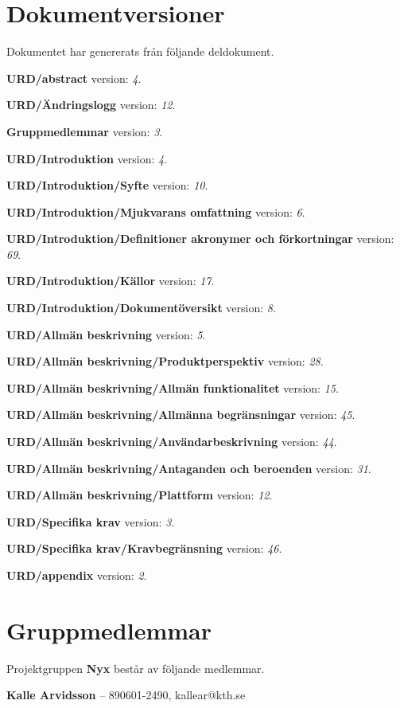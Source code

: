 \documentclass[a4paper, twoside, 11pt, titlepage]{article}
\begin{document}
\clearpage
\section*{Dokumentversioner}


Dokumentet har genererats från följande deldokument.

\textbf{URD/abstract} version: \emph{4}.

\textbf{URD/Ändringslogg} version: \emph{12}.

\textbf{Gruppmedlemmar} version: \emph{3}.

\textbf{URD/Introduktion} version: \emph{4}.

\textbf{URD/Introduktion/Syfte} version: \emph{10}.

\textbf{URD/Introduktion/Mjukvarans omfattning} version: \emph{6}.

\textbf{URD/Introduktion/Definitioner akronymer och förkortningar} version: \emph{69}.

\textbf{URD/Introduktion/Källor} version: \emph{17}.

\textbf{URD/Introduktion/Dokumentöversikt} version: \emph{8}.

\textbf{URD/Allmän beskrivning} version: \emph{5}.

\textbf{URD/Allmän beskrivning/Produktperspektiv} version: \emph{28}.

\textbf{URD/Allmän beskrivning/Allmän funktionalitet} version: \emph{15}.

\textbf{URD/Allmän beskrivning/Allmänna begränsningar} version: \emph{45}.

\textbf{URD/Allmän beskrivning/Användarbeskrivning} version: \emph{44}.

\textbf{URD/Allmän beskrivning/Antaganden och beroenden} version: \emph{31}.

\textbf{URD/Allmän beskrivning/Plattform} version: \emph{12}.

\textbf{URD/Specifika krav} version: \emph{3}.

\textbf{URD/Specifika krav/Kravbegränsning} version: \emph{46}.

\textbf{URD/appendix} version: \emph{2}.

\clearpage
\section*{Gruppmedlemmar}


Projektgruppen \textbf{Nyx} består av följande medlemmar.

\textbf{Kalle Arvidsson} -- 890601-2490, kallear@kth.se
\end{document}

